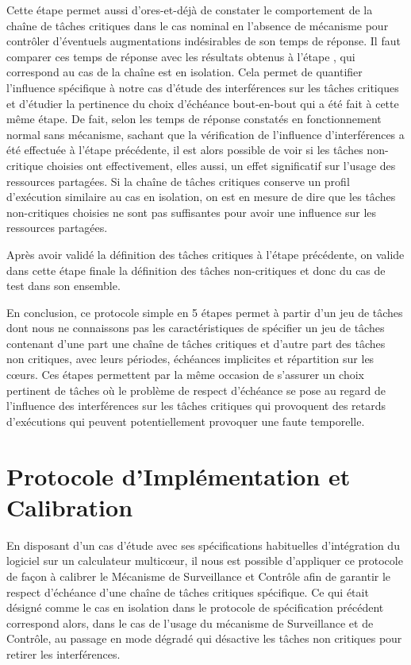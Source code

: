 \documentclass[french, a4paper, 11pt, twoside, pdftex]{StyleThese}
\begin{document}
		Cette étape permet aussi d'ores-et-déjà de constater le comportement de la chaîne de tâches critiques dans le cas nominal en l'absence de mécanisme pour contrôler d'éventuels augmentations indésirables de son temps de réponse. Il faut comparer ces temps de réponse avec les résultats obtenus à l'étape , qui correspond au cas de la chaîne est en isolation. Cela permet de quantifier l'influence spécifique à notre cas d'étude des interférences sur les tâches critiques et d'étudier la pertinence du choix d'échéance bout-en-bout qui a été fait à cette même étape. De fait, selon les temps de réponse constatés en fonctionnement normal sans mécanisme, sachant que la vérification de l'influence d'interférences a été effectuée à l'étape précédente, il est alors possible de voir si les tâches non-critique choisies ont effectivement, elles aussi, un effet significatif sur l'usage des ressources partagées. Si la chaîne de tâches critiques conserve un profil d'exécution similaire au cas en isolation, on est en mesure de dire que les tâches non-critiques choisies ne sont pas suffisantes pour avoir une influence sur les ressources partagées.
		
		Après avoir validé la définition des tâches critiques à l'étape précédente, on valide dans cette étape finale la définition des tâches non-critiques et donc du cas de test dans son ensemble.
		
		
		En conclusion, ce protocole simple en 5 étapes permet à partir d'un jeu de tâches dont nous ne connaissons pas les caractéristiques de spécifier un jeu de tâches contenant d'une part une chaîne de tâches critiques et d'autre part des tâches non critiques, avec leurs périodes, échéances implicites et répartition sur les cœurs. Ces étapes permettent par la même occasion de s'assurer un choix pertinent de tâches où le problème de respect d'échéance se pose au regard de l'influence des interférences sur les tâches critiques qui provoquent des retards d'exécutions qui peuvent potentiellement provoquer une faute temporelle.
                	

                	
                	
\section{Protocole d'Implémentation et Calibration}

		En disposant d'un cas d'étude avec ses spécifications habituelles d'intégration du logiciel sur un calculateur multicœur, il nous est possible d'appliquer ce protocole de façon à calibrer le Mécanisme de Surveillance et Contrôle afin de garantir le respect d'échéance d'une chaîne de tâches critiques spécifique. Ce qui était désigné comme le cas en isolation dans le protocole de spécification précédent correspond alors, dans le cas de l'usage du mécanisme de Surveillance et de Contrôle, au passage en mode dégradé qui désactive les tâches non critiques pour retirer les interférences.
		
\end{document}
